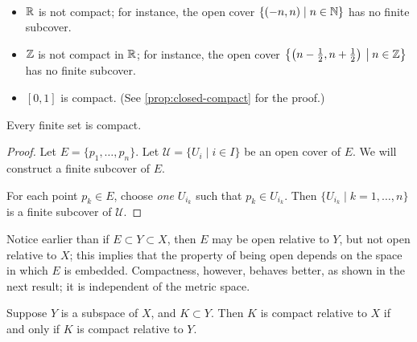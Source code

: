 \begin{example} \
\begin{itemize}
\item $\mathbb R$ is not compact; for instance, the open cover $\{(-n,n)\mid n\in\mathbb N\}$ has no finite subcover.
\item $\mathbb Z$ is not compact in $\mathbb R$; for instance, the open cover $\left\{\left(n-\frac{1}{2},n+\frac{1}{2}\right)\:\big|\:n\in\mathbb Z\right\}$ has no finite subcover.
\item $[0,1]$ is compact. (See \ref{prop:closed-compact} for the proof.)
\end{itemize}
\end{example}

\begin{lemma}
Every finite set is compact.
\end{lemma}

\begin{proof}
Let $E=\{p_1,\dots,p_n\}$. Let $\mathcal{U}=\{U_i\mid i\in I\}$ be an open cover of $E$. We will construct a finite subcover of $E$.

For each point $p_k\in E$, choose \emph{one} $U_{i_k}$ such that $p_k\in U_{i_k}$. Then $\{U_{i_k}\mid k=1,\dots,n\}$ is a finite subcover of $\mathcal{U}$.
\end{proof}

Notice earlier than if $E\subset Y\subset X$, then $E$ may be open relative to $Y$, but not open relative to $X$; this implies that the property of being open depends on the space in which $E$ is embedded. Compactness, however, behaves better, as shown in the next result; it is independent of the metric space.

\begin{proposition}
Suppose $Y$ is a subspace of $X$, and $K\subset Y$. Then $K$ is compact relative to $X$ if and only if $K$ is compact relative to $Y$.
\end{proposition}

